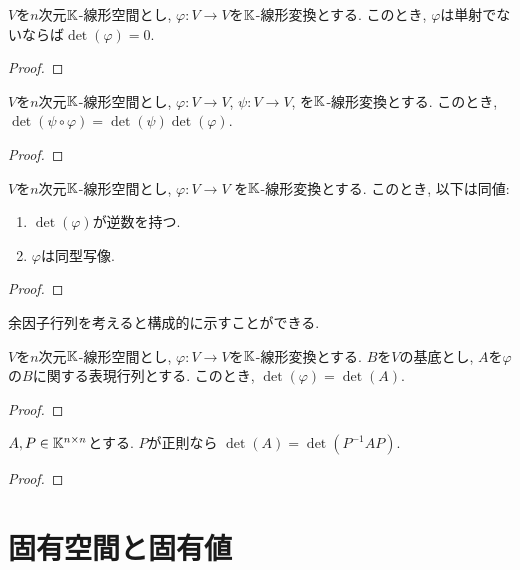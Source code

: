 \begin{lemma}
  $V$を$n$次元$\mathbb{K}$-線形空間とし,
  $\varphi\colon V \to V$を$\mathbb{K}$-線形変換とする.
  このとき,
  $\varphi$は単射でないならば$\det(\varphi)= 0$.
\end{lemma}
\begin{proof}\end{proof}


\begin{prop}
  $V$を$n$次元$\mathbb{K}$-線形空間とし,
  $\varphi\colon V \to V$,
  $\psi\colon V \to V$,
  を$\mathbb{K}$-線形変換とする.
  このとき,
  $\det(\psi\circ \varphi)=\det(\psi)\det(\varphi)$. 
\end{prop}
\begin{proof}\end{proof}

\begin{prop}
  $V$を$n$次元$\mathbb{K}$-線形空間とし,
  $\varphi\colon V \to V$
  を$\mathbb{K}$-線形変換とする.
  このとき,
  以下は同値:
  \begin{enumerate}
  \item $\det(\varphi)$が逆数を持つ.
  \item $\varphi$は同型写像.
  \end{enumerate}
\end{prop}
\begin{proof}\end{proof}
\begin{remark}余因子行列を考えると構成的に示すことができる.\end{remark}


\begin{prop}
  $V$を$n$次元$\mathbb{K}$-線形空間とし,
  $\varphi\colon V \to V$を$\mathbb{K}$-線形変換とする.
  $B$を$V$の基底とし,
  $A$を$\varphi$の$B$に関する表現行列とする.
  このとき,
  $\det(\varphi)=\det(A)$. 
\end{prop}
\begin{proof}\end{proof}

\begin{cor}
  $A, P \in \mathbb{K}^{n\times n}$とする.
  $P$が正則なら
  $\det(A)=\det(P^{-1}AP)$. 
\end{cor}
\begin{proof}\end{proof}


\begin{quiz}
\end{quiz}

\chapter{固有空間と固有値}
